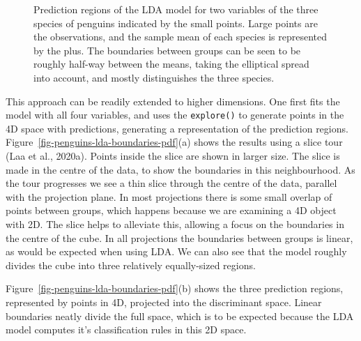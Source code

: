 \documentclass[
  letterpaper,
]{krantz}
\begin{document}
\begin{figure}[H]


\caption{\label{fig-lda-2D-boundary}Prediction regions of the LDA model
for two variables of the three species of penguins indicated by the
small points. Large points are the observations, and the sample mean of
each species is represented by the plus. The boundaries between groups
can be seen to be roughly half-way between the means, taking the
elliptical spread into account, and mostly distinguishes the three
species.}

\end{figure}%

 

This approach can be readily extended to higher dimensions. One first
fits the model with all four variables, and uses the \texttt{explore()}
to generate points in the 4D space with predictions, generating a
representation of the prediction regions.
Figure~\ref{fig-penguins-lda-boundaries-pdf}(a) shows the results using
a slice tour (Laa et al., 2020a). Points inside the slice are shown in
larger size. The slice is made in the centre of the data, to show the
boundaries in this neighbourhood. As the tour progresses we see a thin
slice through the centre of the data, parallel with the projection
plane. In most projections there is some small overlap of points between
groups, which happens because we are examining a 4D object with 2D. The
slice helps to alleviate this, allowing a focus on the boundaries in the
centre of the cube. In all projections the boundaries between groups is
linear, as would be expected when using LDA. We can also see that the
model roughly divides the cube into three relatively equally-sized
regions.

Figure~\ref{fig-penguins-lda-boundaries-pdf}(b) shows the three
prediction regions, represented by points in 4D, projected into the
discriminant space. Linear boundaries neatly divide the full space,
which is to be expected because the LDA model computes it's
classification rules in this 2D space.\\
\end{document}
